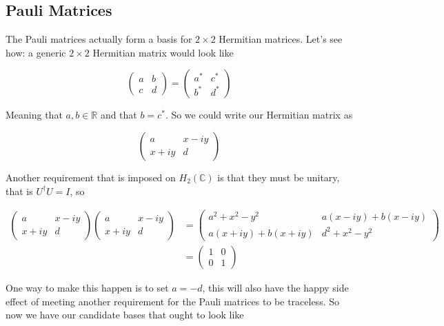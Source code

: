 \subsection{Pauli Matrices}

The Pauli matrices actually form a basis for $2 \times 2$ Hermitian matrices.
Let's see how: a generic $2 \times 2$ Hermitian matrix would look like

$$
\begin{pmatrix}
a & b\\
c & d
\end{pmatrix}
=
\begin{pmatrix}
a^* & c^* \\
b^* & d^*
\end{pmatrix}
$$

Meaning that $a, b \in \mathbb{R}$ and that $b = c^*$.
So we could write our Hermitian matrix as

$$
\begin{pmatrix}
a      & x - iy \\
x + iy & d
\end{pmatrix}
$$

Another requirement that is imposed on $H_2 (\mathbb{C})$ is that they must be unitary, that is $U^\dagger U = I$, so

\begin{align*}
\begin{pmatrix}
a      & x - iy \\
x + iy & d
\end{pmatrix}
\begin{pmatrix}
a      & x - iy \\
x + iy & d
\end{pmatrix}
&=
\begin{pmatrix}
a^2 + x^2 - y^2         & a(x - iy) + b(x - iy) \\
a(x + iy) + b(x + iy) & d^2 + x^2 - y^2
\end{pmatrix}
\\
&=
\begin{pmatrix}
1 & 0 \\
0 & 1
\end{pmatrix}
\end{align*}

One way to make this happen is to set $a = -d$, this will also have the happy side effect of meeting another requirement
for the Pauli matrices to be traceless.
So now we have our candidate bases that ought to look like

